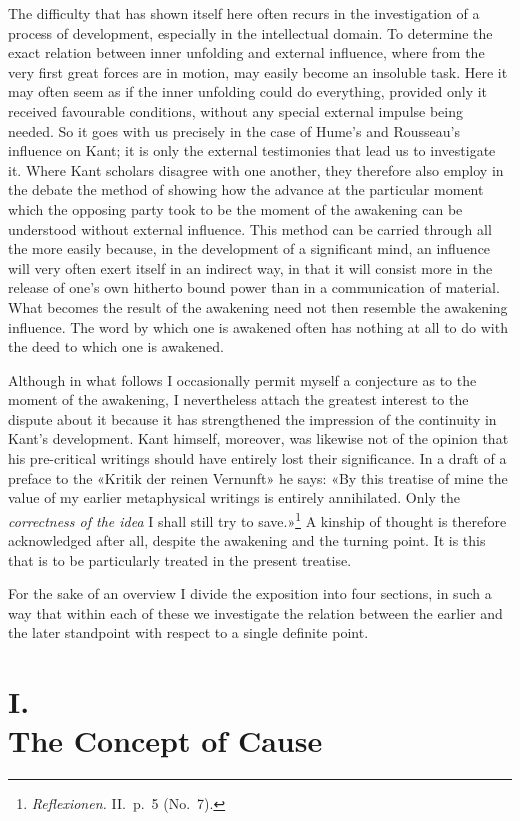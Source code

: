 \documentclass[12pt,a4paper]{article}
\newcommand{\opage}[1]{\marginnote{\footnotesize\textit{[#1]}}}
\begin{document}
The difficulty that has shown itself here often recurs in the
investigation of a process of development, especially in the intellectual
domain. To determine the exact relation between inner unfolding and
external influence, where from the very first great forces are in motion,
may easily become an insoluble task. Here it may often seem as if the
inner unfolding could do everything, provided only it received favourable
conditions, without any special external impulse being needed. So it goes
with us precisely in the case of Hume's and Rousseau's influence on Kant;
it is only the external testimonies that lead us to investigate it. Where
Kant scholars disagree with one another, they therefore also employ in the
debate the method of showing how the advance at the particular moment
which the opposing party took to be the moment of the awakening can be
understood without external influence. This method can be carried through
all the more easily because, in the development of a significant mind, an
influence will very often exert itself in an indirect way, in that it will
consist more in the release of one's own hitherto bound power than in a
communication of material. What becomes the result of the awakening need
not then resemble the awakening influence. The word by which one is
awakened often has nothing at all to do with the deed to which one is
awakened.

Although in what follows I occasionally permit myself a conjecture as to
the moment of the awakening, I nevertheless attach the greatest interest
to the dispute about it because it has strengthened the impression of the
continuity in Kant's development. Kant himself, moreover, was likewise not
of the opinion that his pre-critical writings should have entirely lost
their significance. In a draft of a preface to the «Kritik der reinen
Vernunft» he says: «By this treatise of mine the value of my earlier
metaphysical writings is entirely annihilated. Only the \emph{correctness of the
idea} I shall still try to save.»\footnote{\textit{Reflexionen.} II.\ p.\ 5
(No.\ 7).} A kinship of thought is therefore acknowledged after all,
despite the awakening and the turning point. It is this that is to be
particularly treated in the present treatise.

For the sake of an overview I divide the exposition into four sections, in
such a way that within \opage{9}each of these we investigate the relation between
the earlier and the later standpoint with respect to a single definite
point.

\section*{I.\\ The Concept of Cause}
\end{document}
